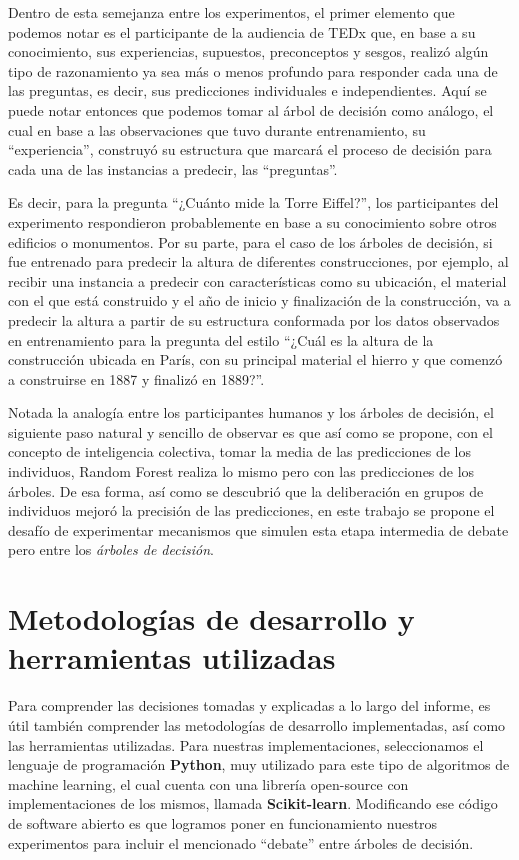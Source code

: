 Dentro de esta semejanza entre los experimentos, el primer elemento que podemos notar es el participante de la audiencia de TEDx que, en base a su conocimiento, sus experiencias, supuestos, preconceptos y sesgos, realizó algún tipo de razonamiento ya sea más o menos profundo para responder cada una de las preguntas, es decir, sus predicciones individuales e independientes. Aquí se puede notar entonces que podemos tomar al árbol de decisión como análogo, el cual en base a las observaciones que tuvo durante entrenamiento, su “experiencia”, construyó su estructura que marcará el proceso de decisión para cada una de las instancias a predecir, las “preguntas”.

Es decir, para la pregunta “¿Cuánto mide la Torre Eiffel?”, los participantes del experimento respondieron probablemente en base a su conocimiento sobre otros edificios o monumentos. Por su parte, para el caso de los árboles de decisión, si fue entrenado para predecir la altura de diferentes construcciones, por ejemplo, al recibir una instancia a predecir con características como su ubicación, el material con el que está construido y el año de inicio y finalización de la construcción, va a predecir la altura a partir de su estructura conformada por los datos observados en entrenamiento para la pregunta del estilo “¿Cuál es la altura de la construcción ubicada en París, con su principal material el hierro y que comenzó a construirse en 1887 y finalizó en 1889?”.

Notada la analogía entre los participantes humanos y los árboles de decisión, el siguiente paso natural y sencillo de observar es que así como se propone, con el concepto de inteligencia colectiva, tomar la media de las predicciones de los individuos, Random Forest realiza lo mismo pero con las predicciones de los árboles. De esa forma, así como se descubrió que la deliberación en grupos de individuos mejoró la precisión de las predicciones, en este trabajo se propone el desafío de experimentar mecanismos que simulen esta etapa intermedia de debate pero entre los \textit{árboles de decisión}.

\section{Metodologías de desarrollo y herramientas utilizadas}

Para comprender las decisiones tomadas y explicadas a lo largo del informe, es útil también comprender las metodologías de desarrollo implementadas, así como las herramientas utilizadas.
Para nuestras implementaciones, seleccionamos el lenguaje de programación \textbf{Python}, muy utilizado para este tipo de algoritmos de machine learning, el cual cuenta con una librería open-source con implementaciones de los mismos, llamada \textbf{Scikit-learn}. Modificando ese código de software abierto es que logramos poner en funcionamiento nuestros experimentos para incluir el mencionado ``debate'' entre árboles de decisión.

